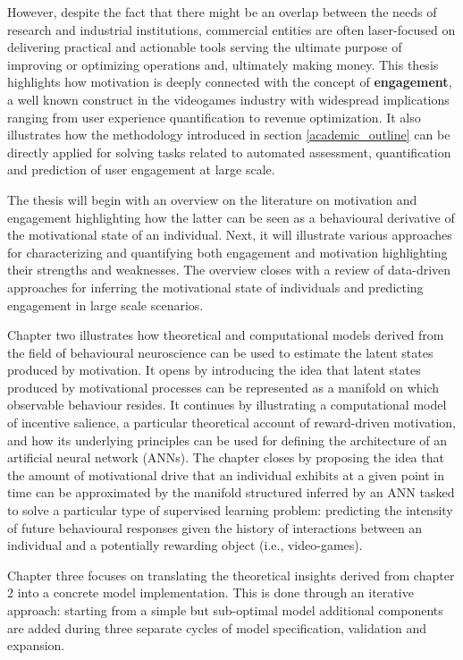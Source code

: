 However, despite the fact that there might be an overlap between the needs of research and industrial institutions, commercial entities are often laser-focused on delivering practical and actionable tools serving the ultimate purpose of improving or optimizing operations and, ultimately making money. This thesis highlights how motivation is deeply connected with the concept of \textbf{engagement}, a well known construct in the videogames industry with widespread implications ranging from user experience quantification to revenue optimization. It also illustrates how the methodology introduced in section \ref{academic_outline} can be directly applied for solving tasks related to automated assessment, quantification and prediction of user engagement at large scale.

The thesis will begin with an overview on the literature on motivation and engagement highlighting how the latter can be seen as a behavioural derivative of the motivational state of an individual. Next, it will illustrate various approaches for characterizing and quantifying both engagement and motivation highlighting their strengths and weaknesses. The overview closes with a review of data-driven approaches for inferring the motivational state of individuals and predicting engagement in large scale scenarios. 

Chapter two illustrates how theoretical and computational models derived from the field of behavioural neuroscience can be used to estimate the latent states produced by motivation. It opens by introducing the idea that latent states produced by motivational processes can be represented as a manifold on which observable behaviour resides. It continues by illustrating a computational model of incentive salience, a particular theoretical account of reward-driven motivation, and how its underlying principles can be used for defining the architecture of an artificial neural network (ANNs). The chapter closes by proposing the idea that the amount of motivational drive that an individual exhibits at a given point in time can be approximated by the manifold structured inferred by an ANN tasked to solve a particular type of supervised learning problem: predicting the intensity of future behavioural responses given the history of interactions between an individual and a potentially rewarding object (i.e., video-games). 

Chapter three focuses on translating the theoretical insights derived from chapter 2 into a concrete model implementation. This is done through an iterative approach: starting from a simple but sub-optimal model additional components are added during three separate cycles of model specification, validation and expansion. 

